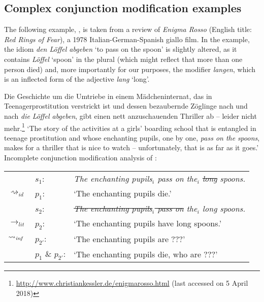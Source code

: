 \documentclass[output=paper]{langsci/langscibook}
\begin{document}
\subsection{Complex conjunction modification examples} \label{complex cases}

The following example, , is taken from a review of \textit{Enigma Rosso} (English title: \textit{Red Rings of Fear}), a 1978 Italian-German-Spanish giallo film. In the example, the idiom \textit{den Löffel abgeben} `to pass on the spoon' is slightly altered, as it contains \textit{Löffel} `spoon' in the plural (which might reflect that more than one person died) and, more importantly for our purposes, the modifier \textit{langen}, which is an inflected form of the adjective \textit{lang} `long'.

\ea \label{long spoons}
Die Geschichte um die Umtriebe in einem Mädcheninternat, das in Teen\-agerprostitution verstrickt ist und dessen bezaubernde Zöglinge nach und nach \textit{die} \underline{} \textit{Löffel abgeben}, gibt einen nett anzuschauenden Thriller ab -- leider nicht mehr.\footnote{\url{http://www.christiankessler.de/enigmarosso.html} (last accessed on 5 April 2018)}
\glt `The story of the activities at a girls' boarding school that is entangled in teenage prostitution and whose enchanting pupils, one by one, \textit{pass on the} \underline{} \textit{spoons}, makes for a thriller that is nice to watch -- unfortunately, that is as far as it goes.'
\ex \label{analysis long spoons -- incomplete} 
Incomplete conjunction modification analysis of :\smallskip\\
\begin{tabularx}{\linewidth}[t]{@{}llQ@{}}
							& 	$s_{1}$: & \textit{The enchanting pupils$_{i}$ pass on the$_{i}$ \sout{long} spoons.} \\
$\rightsquigarrow_{id}$		&	$p_{1}$: & `The enchanting pupils die.'\medskip\\
							& 	$s_{2}$: & \textit{\sout{The enchanting pupils$_{i}$ pass on} the$_{i}$ long spoons.} \\
$\rightarrow_{lit}$			&	$p_{2}$: & `The enchanting pupils have long spoons.' \\
$\rightsquigarrow_{\text{\itshape inf}}$	&	$p_{2'}$: & `The enchanting pupils are ???'\medskip\\
                            &	$p_{1}$ \& $p_{2'}$: & `The enchanting pupils die, who are ???' \\
\end{tabularx}
\z
\end{document}
